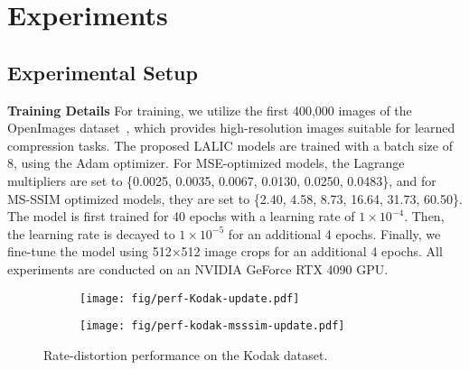 \section{Experiments}
\subsection{Experimental Setup}

\noindent\textbf{Training Details} \; 
For training, we utilize the first 400,000 images of the OpenImages dataset~\cite{Kuznetsova.2020.OpenImages}, which provides high-resolution images suitable for learned compression tasks. The proposed LALIC models are trained with a batch size of 8, using the Adam optimizer. 
%
%
For MSE-optimized models, the Lagrange multipliers are set to \{0.0025, 0.0035, 0.0067, 0.0130, 0.0250, 0.0483\}, and for MS-SSIM optimized models, they are set to \{2.40, 4.58, 8.73, 16.64, 31.73, 60.50\}. The model is first trained for 40 epochs with a learning rate of \(1 \times 10^{-4}\). Then, the learning rate is decayed to \(1 \times 10^{-5}\) for an additional 4 epochs. Finally, we fine-tune the model using 512$\times$512 image crops for an additional 4 epochs. All experiments are conducted on an NVIDIA GeForce RTX 4090 GPU.



\begin{figure*}[h!]
  \centering
  \begin{subfigure}[b]{0.48\textwidth}
    \texttt{[image: fig/perf-Kodak-update.pdf]}
    \label{fig:perf-kodak-psnr}
  \end{subfigure}
  \hfill
  \begin{subfigure}[b]{0.48\textwidth}
    \texttt{[image: fig/perf-kodak-msssim-update.pdf]}
    \label{fig:perf-kodak-msssim}
  \end{subfigure}
  \vspace{-1em}
  \caption{Rate-distortion performance on the Kodak dataset.}
  \label{fig:perf-kodak}
\end{figure*}

